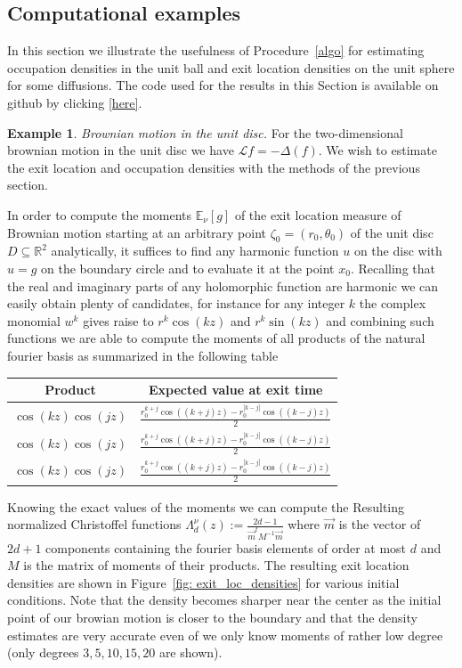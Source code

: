\documentclass[12pt]{amsart}
\theoremstyle{definition}
\newtheorem{examplex}[lemma]{Example}
\newcommand{\RR}{\ensuremath{\mathbb{R}}}
\newcommand{\EE}{\ensuremath{\mathbb{E}}}
\begin{document}
\subsection{Computational examples}
In this section we illustrate the usefulness of Procedure~\ref{algo} for estimating occupation densities in the unit ball and exit location densities on the unit sphere for some diffusions. The code used for the results in this Section is available on github by clicking \href{https://github.com/mauricio-velasco/Exit_location_density_estimation.git}{[here]}.

\begin{examplex} {\it Brownian motion in the unit disc.} For the two-dimensional brownian motion in the unit disc we have $\mathcal{L}f=-\Delta(f)$. We wish to estimate the exit location and occupation densities with the methods of the previous section. 

In order to compute the moments $\EE_{\nu}[g]$ of the exit location measure of Brownian motion starting at an arbitrary point $\zeta_0 = (r_0,\theta_0)$ of the unit disc $D\subseteq \RR^2$ analytically, it suffices to find any harmonic function $u$ on the disc with $u=g$ on the boundary circle and to evaluate it at the point $x_0$. Recalling that the real and imaginary parts of any holomorphic function are harmonic we can easily obtain plenty of candidates, for instance for any integer $k$ the complex monomial $w^k$ gives raise to $r^k\cos(kz)$ and $r^k\sin(kz)$ and combining such functions we are able to compute the moments of all products of the natural fourier basis as summarized in the following table\\

\begin{center}
\begin{tabular}{c|c}
Product & Expected value at exit time\\
\hline
$\cos(kz)\cos(jz)$ & $\frac{r_0^{k+j}\cos((k+j)z)-r_0^{|k-j|}\cos((k-j)z)}{2}$\\
$\cos(kz)\cos(jz)$ & $\frac{r_0^{k+j}\cos((k+j)z)-r_0^{|k-j|}\cos((k-j)z)}{2}$\\
$\cos(kz)\cos(jz)$ & $\frac{r_0^{k+j}\cos((k+j)z)-r_0^{|k-j|}\cos((k-j)z)}{2}$\\
\end{tabular} 
\end{center}

Knowing the exact values of the moments we can compute the Resulting normalized Christoffel functions $\Lambda^{\nu}_d(z):=\frac{2d-1}{\vec{m}^t M^{-1}\vec{m}}$
where $\vec{m}$ is the vector of $2d+1$ components containing the fourier basis elements of order at most $d$ and $M$ is the matrix of moments of their products. The resulting exit location densities are shown in Figure~\ref{fig: exit_loc_densities} for various initial conditions. Note that the density becomes sharper near the center as the initial point of our browian motion is closer to the boundary and that the density estimates are very accurate even of we only know moments of rather low degree (only degrees $3,5,10,15,20$ are shown).



\end{examplex}
\end{document}
